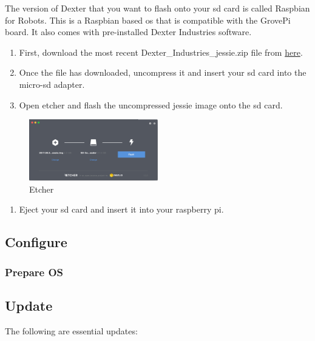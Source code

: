 The version of Dexter that you want to flash onto your sd card is called
Raspbian for Robots. This is a Raspbian based os that is compatible with
the GrovePi board. It also comes with pre-installed Dexter Industries
software.

\begin{enumerate}
\def\labelenumi{\arabic{enumi}.}
\tightlist
\item
  First, download the most recent Dexter\_Industries\_jessie.zip file
  from
  \href{https://sourceforge.net/projects/dexterindustriesraspbianflavor/}{here}.
\item
  Once the file has downloaded, uncompress it and insert your sd card
  into the micro-sd adapter.
\item
  Open etcher and flash the uncompressed jessie image onto the sd card.
\end{enumerate}

\begin{figure}
\centering
\includegraphics[width=0.5\textwidth]{images/etcher.png}
\caption{Etcher}
\end{figure}

\begin{enumerate}
\def\labelenumi{\arabic{enumi}.}
\setcounter{enumi}{3}
\tightlist
\item
  Eject your sd card and insert it into your raspberry pi.
\end{enumerate}

\subsection{Configure}\label{configure}

\subsubsection{Prepare OS}\label{prepare-os}

\subsection{Update}\label{update}

The following are essential updates:

